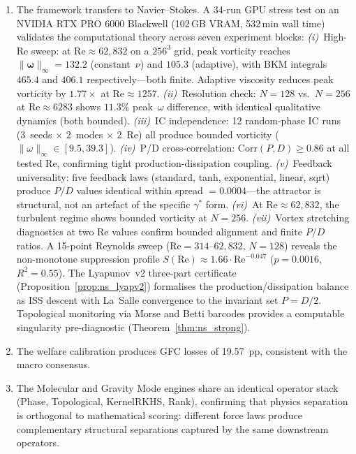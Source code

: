 \documentclass[final]{siamltex}
\begin{document}
\begin{enumerate}
\item The framework transfers to Navier--Stokes.  A 34-run
  GPU stress test on an NVIDIA RTX PRO 6000 Blackwell
  (102\,GB VRAM, 532\,min wall time) validates the
  computational theory across seven experiment blocks:
  \emph{(i)}~High-Re sweep: at $\mathrm{Re}\approx 62{,}832$
  on a $256^3$ grid, peak vorticity reaches
  $\|\bm{\omega}\|_\infty = 132.2$ (constant~$\nu$) and
  $105.3$ (adaptive), with BKM integrals $465.4$ and $406.1$
  respectively---both finite.  Adaptive viscosity reduces
  peak vorticity by $1.77\times$ at $\mathrm{Re}\approx 1257$.
  \emph{(ii)}~Resolution check: $N=128$ vs.\ $N=256$ at
  $\mathrm{Re}\approx 6283$ shows $11.3\%$ peak~$\omega$
  difference, with identical qualitative dynamics (both bounded).
  \emph{(iii)}~IC independence: 12 random-phase IC runs
  (3~seeds $\times$ 2~modes $\times$ 2~Re) all produce
  bounded vorticity ($\|\omega\|_\infty \in [9.5, 39.3]$).
  \emph{(iv)}~P/D cross-correlation:
  $\mathrm{Corr}(P,D) \ge 0.86$ at all tested Re, confirming
  tight production-dissipation coupling.
  \emph{(v)}~Feedback universality: five feedback laws
  (standard, tanh, exponential, linear, sqrt) produce
  $P/D$ values identical within spread $= 0.0004$---the
  attractor is structural, not an artefact of the specific
  $\gamma^*$ form.
  \emph{(vi)}~At $\mathrm{Re}\approx 62{,}832$, the turbulent
  regime shows bounded vorticity at $N=256$.
  \emph{(vii)}~Vortex stretching diagnostics at two Re values
  confirm bounded alignment and finite $P/D$ ratios.
  A 15-point Reynolds sweep
  ($\mathrm{Re}=314$--$62{,}832$, $N=128$) reveals the
  non-monotone suppression profile
  $S(\mathrm{Re})\approx 1.66\cdot\mathrm{Re}^{-0.047}$
  ($p=0.0016$, $R^2=0.55$).
  The Lyapunov~v2 three-part certificate
  (Proposition~\ref{prop:ns_lyapv2}) formalises the
  production/dissipation balance as ISS descent with La~Salle
  convergence to the invariant set $P = D/2$.  Topological
  monitoring via Morse and Betti barcodes provides a computable
  singularity pre-diagnostic
  (Theorem~\ref{thm:ns_strong}).

\item The welfare calibration produces GFC losses of 19.57~pp,
  consistent with the macro consensus.

\item The Molecular and Gravity Mode engines share an identical
  operator stack (Phase, Topological, KernelRKHS, Rank), confirming
  that physics separation is orthogonal to mathematical scoring:
  different force laws produce complementary structural separations
  captured by the same downstream operators.


\end{enumerate}
\end{document}
